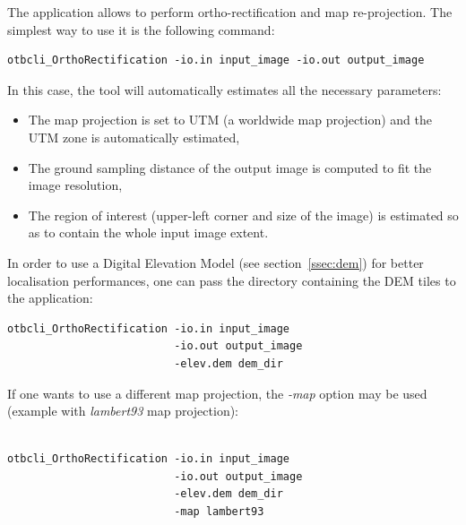 The  application allows to
perform ortho-rectification and map re-projection. The simplest way to
use it is the following command:
\begin{verbatim}
otbcli_OrthoRectification -io.in input_image -io.out output_image
\end{verbatim}

In this case, the tool will automatically estimates all the necessary
parameters:
\begin{itemize}
\item The map projection is set to UTM (a worldwide map projection)
  and the UTM zone is automatically estimated,
\item The ground sampling distance of the output image is computed to
  fit the image resolution,
\item The region of interest (upper-left corner and size of the image)
  is estimated so as to contain the whole input image extent.
\end{itemize}

In order to use a Digital Elevation Model (see section~\ref{ssec:dem})
for better localisation performances, one can pass the directory
containing the DEM tiles to the application:

\begin{verbatim}
otbcli_OrthoRectification -io.in input_image
                          -io.out output_image
                          -elev.dem dem_dir
\end{verbatim}

If one wants to use a different map projection, the \emph{-map}
option may be used (example with \emph{lambert93} map projection):

\begin{verbatim}

otbcli_OrthoRectification -io.in input_image
                          -io.out output_image
                          -elev.dem dem_dir
                          -map lambert93

\end{verbatim}

